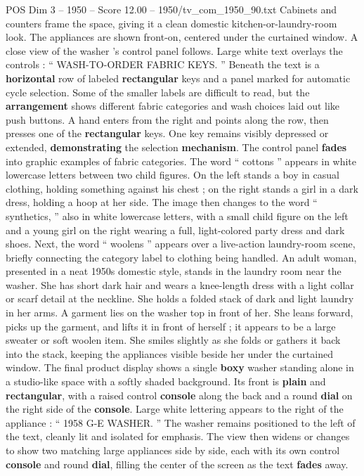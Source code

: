 \begin{textsample}{POS Dim 3 – 1950 – Score 12.00 – 1950/tv\_com\_1950\_90.txt}
Cabinets and counters frame the space, giving it a clean domestic kitchen-or-laundry-room look.
The appliances are shown front-on, centered under the curtained window.
A close view of the washer ’s control panel follows.
Large white text overlays the controls : “ WASH-TO-ORDER FABRIC KEYS. ” Beneath the text is a \textbf{horizontal} row of labeled \textbf{rectangular} keys and a panel marked for automatic cycle selection.
Some of the smaller labels are difficult to read, but the \textbf{arrangement} shows different fabric categories and wash choices laid out like push buttons.
A hand enters from the right and points along the row, then presses one of the \textbf{rectangular} keys.
One key remains visibly depressed or extended, \textbf{demonstrating} the selection \textbf{mechanism}.
The control panel \textbf{fades} into graphic examples of fabric categories.
The word “ cottons ” appears in white lowercase letters between two child figures.
On the left stands a boy in casual clothing, holding something against his chest ; on the right stands a girl in a dark dress, holding a hoop at her side.
The image then changes to the word “ synthetics, ” also in white lowercase letters, with a small child figure on the left and a young girl on the right wearing a full, light-colored party dress and dark shoes.
Next, the word “ woolens ” appears over a live-action laundry-room scene, briefly connecting the category label to clothing being handled.
An adult woman, presented in a neat 1950s domestic style, stands in the laundry room near the washer.
She has short dark hair and wears a knee-length dress with a light collar or scarf detail at the neckline.
She holds a folded stack of dark and light laundry in her arms.
A garment lies on the washer top in front of her.
She leans forward, picks up the garment, and lifts it in front of herself ; it appears to be a large sweater or soft woolen item.
She smiles slightly as she folds or gathers it back into the stack, keeping the appliances visible beside her under the curtained window.
The final product display shows a single \textbf{boxy} washer standing alone in a studio-like space with a softly shaded background.
Its front is \textbf{plain} and \textbf{rectangular}, with a raised control \textbf{console} along the back and a round \textbf{dial} on the right side of the \textbf{console}.
Large white lettering appears to the right of the appliance : “ 1958 G-E WASHER. ” The washer remains positioned to the left of the text, cleanly lit and isolated for emphasis.
The view then widens or changes to show two matching large appliances side by side, each with its own control \textbf{console} and round \textbf{dial}, filling the center of the screen as the text \textbf{fades} away.

\end{textsample}
